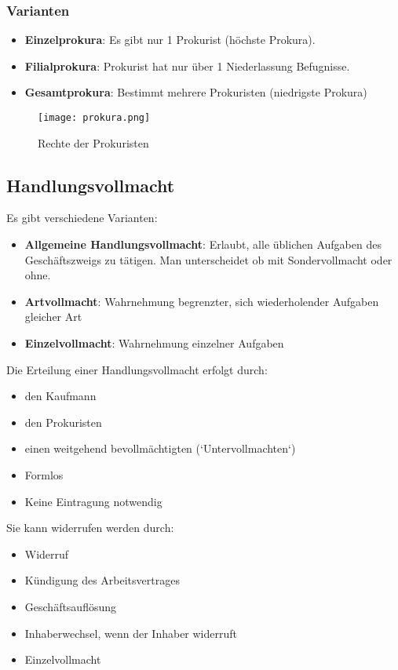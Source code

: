 \documentclass[asp1.tex]{subfiles}
\begin{document}
\subsubsection{Varianten}
\begin{itemize}
    \item \textbf{Einzelprokura}: Es gibt nur 1  Prokurist (höchste Prokura).
    \item \textbf{Filialprokura}: Prokurist hat nur über 1 Niederlassung Befugnisse.
    \item \textbf{Gesamtprokura}: Bestimmt mehrere Prokuristen (niedrigste Prokura)
\end{itemize}

\begin{figure}[H]
    \begin{center}
        \texttt{[image: prokura.png]}
    \end{center}
    \caption{Rechte der Prokuristen}
    \label{fig:Rechte der Prokuristen}
\end{figure}

\subsection{Handlungsvollmacht}
Es gibt verschiedene Varianten:
\begin{itemize}
    \item \textbf{Allgemeine Handlungsvollmacht}: Erlaubt, alle üblichen Aufgaben des Geschäftszweigs zu tätigen. Man unterscheidet ob mit Sondervollmacht oder ohne.
    \item \textbf{Artvollmacht}: Wahrnehmung begrenzter, sich wiederholender Aufgaben gleicher Art
    \item \textbf{Einzelvollmacht}:  Wahrnehmung einzelner Aufgaben
\end{itemize}
Die  Erteilung einer  Handlungsvollmacht  erfolgt durch:
\begin{itemize}
    \item den Kaufmann
    \item den Prokuristen
    \item einen weitgehend bevollmächtigten (`Untervollmachten`)
    \item Formlos
    \item Keine Eintragung notwendig
\end{itemize}
Sie kann widerrufen werden durch:
\begin{itemize}
    \item Widerruf
    \item Kündigung des Arbeitsvertrages
    \item Geschäftsauflösung
    \item Inhaberwechsel, wenn der Inhaber widerruft
    \item Einzelvollmacht
\end{itemize}
\end{document}
